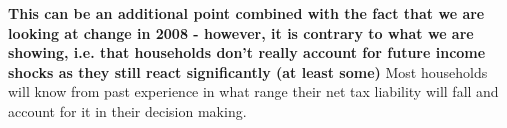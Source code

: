 \textbf{This can be an additional point combined with the fact that we are looking at change in 2008 - however, it is contrary to what we are showing, i.e. that households don't really account for future income shocks as they still react significantly (at least some)}
Most households will know from past experience in what range their net tax liability will fall and account for it in their decision making. 
